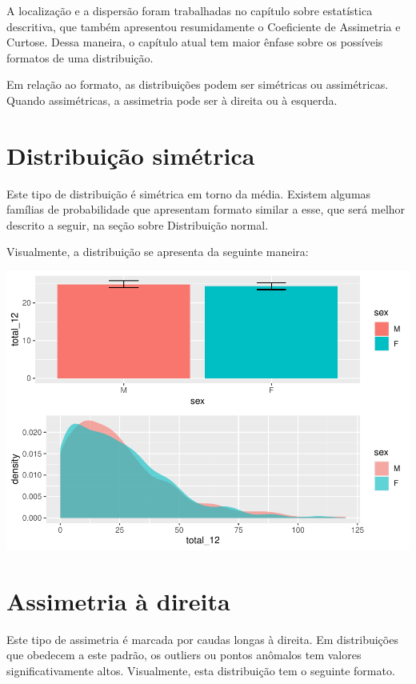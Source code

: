 \documentclass[
]{book}
\begin{document}
A localização e a dispersão foram trabalhadas no capítulo sobre estatística descritiva, que também apresentou resumidamente o Coeficiente de Assimetria e Curtose. Dessa maneira, o capítulo atual tem maior ênfase sobre os possíveis formatos de uma distribuição.

Em relação ao formato, as distribuições podem ser simétricas ou assimétricas. Quando assimétricas, a assimetria pode ser à direita ou à esquerda.

\hypertarget{distribuiuxe7uxe3o-simuxe9trica}{%
\section{Distribuição simétrica}\label{distribuiuxe7uxe3o-simuxe9trica}}

Este tipo de distribuição é simétrica em torno da média. Existem algumas famílias de probabilidade que apresentam formato similar a esse, que será melhor descrito a seguir, na seção sobre Distribuição normal.

Visualmente, a distribuição se apresenta da seguinte maneira:

\begin{center}\includegraphics{gitbook-demo_files/figure-latex/unnamed-chunk-32-1} \end{center}

\hypertarget{assimetria-uxe0-direita}{%
\section{Assimetria à direita}\label{assimetria-uxe0-direita}}

Este tipo de assimetria é marcada por caudas longas à direita. Em distribuições que obedecem a este padrão, os outliers ou pontos anômalos tem valores significativamente altos. Visualmente, esta distribuição tem o seguinte formato.
\end{document}
